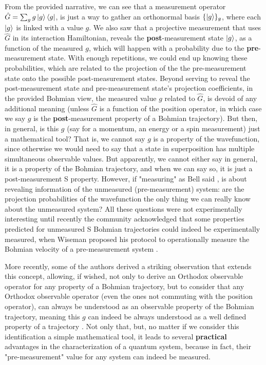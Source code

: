\documentclass[11pt, a4paper]{article} %
\begin{document}
From the provided narrative, we can see that a measurement operator $\hat{G}=\sum_g g\ket{g}\bra{g}$, is just a way to gather an orthonormal basis $\{\ket{g}\}_g$, where each $\ket{g}$ is linked with a value $g$. We also saw that a projective measurement that uses $\hat{G}$ in its interaction Hamiltonian, reveals the {\bf post}-measurement state $\ket{g}$, as a function of the measured $g$, which will happen with a probability due to the {\bf pre}-measurement state. With enough repetitions, we could end up knowing these probabilities, which are related to the projection of the the pre-measurement state onto the possible post-measurement states. Beyond serving to reveal the post-measurement state and pre-measurement state's projection coefficients, in the provided Bohmian view, the measured value $g$ related to $\hat{G}$, is devoid of any additional meaning (unless $\hat{G}$ is a function of the position operator, in which case we say $g$ is the {\bf post}-measurement property of a Bohmian trajectory). But then, in general, is this $g$ (say for a momentum, an energy or a spin measurement) just a mathematical tool? That is, we cannot say $g$ is a property of the wavefunction, since otherwise we would need to say that a state in superposition has multiple simultaneous observable values. But apparently, we cannot either say in general, it is a property of the Bohmian trajectory, and when we can say so, it is just a post-measurement S property. However, if "measuring" as Bell said \cite{Bell}, is about revealing information of the unmeasured (pre-measurement) system: are the projection probabilities of the wavefunction the only thing we can really know about the unmeasured system? All these questions were not experimentally interesting until recently the community acknowledged that some properties predicted for unmeasured S Bohmian trajectories could indeed be experimentally measured, when Wiseman proposed his protocol to operationally measure the Bohmian velocity of a pre-measurement system \cite{WisemanVel}.

More recently, some of the authors derived a striking observation that extends this concept, allowing, if wished, not only to derive an Orthodox observable operator for any property of a Bohmian trajectory, but to consider that any Orthodox observable operator (even the ones not commuting with the position operator), can always be understood as an observable property of the Bohmian trajectory, meaning this $g$ can indeed be always understood as a well defined property of a trajectory \cite{DevInPosition1, DevInPosition2}. Not only that, but, no matter if we consider this identification a simple mathematical tool, it leads to several {\bf practical} advantages in the characterization of a quantum system, because in fact, their "pre-measurement" value for any system can indeed be measured.
\end{document}
